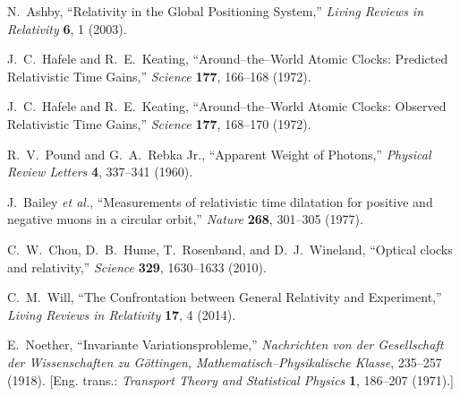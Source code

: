 \documentclass[12pt]{article}
\theoremstyle{plain}
\begin{document}
\begin{thebibliography}{99}
N.~Ashby,
``Relativity in the Global Positioning System,''
\emph{Living Reviews in Relativity} \textbf{6}, 1 (2003).

J.~C.~Hafele and R.~E.~Keating,
``Around–the–World Atomic Clocks: Predicted Relativistic Time Gains,''
\emph{Science} \textbf{177}, 166--168 (1972).

J.~C.~Hafele and R.~E.~Keating,
``Around–the–World Atomic Clocks: Observed Relativistic Time Gains,''
\emph{Science} \textbf{177}, 168--170 (1972).

R.~V.~Pound and G.~A.~Rebka Jr.,
``Apparent Weight of Photons,''
\emph{Physical Review Letters} \textbf{4}, 337--341 (1960).

J.~Bailey \emph{et al.},
``Measurements of relativistic time dilatation for positive and negative muons in a circular orbit,''
\emph{Nature} \textbf{268}, 301--305 (1977).

C.~W.~Chou, D.~B.~Hume, T.~Rosenband, and D.~J.~Wineland,
``Optical clocks and relativity,''
\emph{Science} \textbf{329}, 1630--1633 (2010).

C.~M.~Will,
``The Confrontation between General Relativity and Experiment,''
\emph{Living Reviews in Relativity} \textbf{17}, 4 (2014).

E.~Noether,
``Invariante Variationsprobleme,''
\emph{Nachrichten von der Gesellschaft der Wissenschaften zu G\"ottingen, Mathematisch–Physikalische Klasse}, 235--257 (1918).
[Eng. trans.: \emph{Transport Theory and Statistical Physics} \textbf{1}, 186--207 (1971).]

\end{thebibliography}
\end{document}
